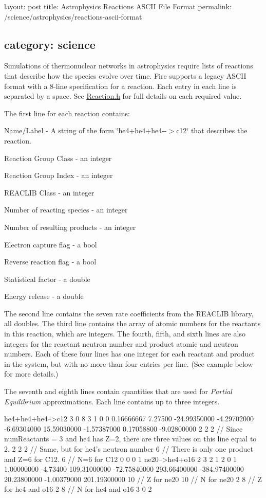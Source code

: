 

 layout\+: post title\+: Astrophysics Reactions A\+S\+C\+II File Format permalink\+: /science/astrophysics/reactions-\/ascii-\/format \subsection*{category\+: science }

Simulations of thermonuclear networks in astrophysics require lists of reactions that describe how the species evolve over time. Fire supports a legacy A\+S\+C\+II format with a 8-\/line specification for a reaction. Each entry in each line is separated by a space. See \hyperlink{a00320_source}{Reaction.\+h} for full details on each required value.

The first line for each reaction contains\+:


\begin{DoxyItemize}
\item Name/\+Label -\/ A string of the form \char`\"{}he4+he4+he4-\/-\/$>$c12\char`\"{} that describes the reaction.
\item Reaction Group Class -\/ an integer
\item Reaction Group Index -\/ an integer
\item R\+E\+A\+C\+L\+IB Class -\/ an integer
\item Number of reacting species -\/ an integer
\item Number of resulting products -\/ an integer
\item Electron capture flag -\/ a bool
\item Reverse reaction flag -\/ a bool
\item Statistical factor -\/ a double
\item Energy release -\/ a double
\end{DoxyItemize}

The second line contains the seven rate coefficients from the R\+E\+A\+C\+L\+IB library, all doubles. The third line contains the array of atomic numbers for the reactants in this reaction, which are integers. The fourth, fifth, and sixth lines are also integers for the reactant neutron number and product atomic and neutron numbers. Each of these four lines has one integer for each reactant and product in the system, but with no more than four entries per line. (See example below for more details.)

The seventh and eighth lines contain quantities that are used for {\itshape Partial Equilibrium} approximations. Each line contains up to three integers.


\begin{DoxyCode}
he4+he4+he4-->c12 3 0 8 3 1 0 0 0.16666667 7.27500
-24.99350000 -4.29702000 -6.69304000 15.59030000 -1.57387000 0.17058800 -9.02800000
2 2 2 // Since numReactants = 3 and he4 has Z=2, there are three values on this line equal to 2.
2 2 2 // Same, but for he4's neutron number
6 // There is only one product and Z=6 for C12.
6 // N=6 for C12
0 0 0 
1 
ne20-->he4+o16 2 3 2 1 2 0 1 1.00000000 -4.73400
109.31000000 -72.75840000 293.66400000 -384.97400000 20.23800000 -1.00379000 201.19300000
10 // Z for ne20
10 // N for ne20
2 8 // Z for he4 and o16
2 8 // N for he4 and o16
3 
0 2 
\end{DoxyCode}
 